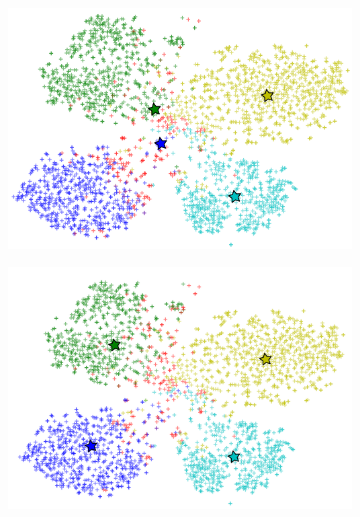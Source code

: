 \documentclass[10pt,twocolumn,letterpaper]{article}
\begin{document}
\begin{figure}[t]
%
  \begin{subfigure}[b]{0.25\linewidth}
    \includegraphics[width=\linewidth]{own_cluster}
    \caption{}
    \label{fig:clustering}
  \end{subfigure}
%
  \begin{subfigure}[b]{0.25\linewidth}
    \includegraphics[width=\linewidth]{jeac}
    \caption{}
    \label{fig:joint}


\end{subfigure}
\end{figure}
\end{document}

